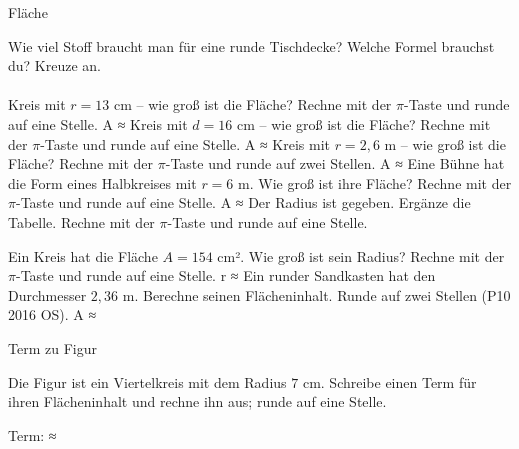 \setcounter{aufgabe}{14}

\begin{aufgabe}{Fläche}
\begin{teile}
\teil Wie viel Stoff braucht man für eine runde Tischdecke? Welche Formel brauchst du? Kreuze an.\\ \\ 
\teil Kreis mit $r = 13$ cm – wie groß ist die Fläche? Rechne mit der $\pi$-Taste und runde auf eine Stelle. A ≈ \leerfeld[cm²]
\teil Kreis mit $d = 16$ cm – wie groß ist die Fläche? Rechne mit der $\pi$-Taste und runde auf eine Stelle. A ≈ \leerfeld[cm²]
\teil Kreis mit $r = 2{,}6$ m – wie groß ist die Fläche? Rechne mit der $\pi$-Taste und runde auf zwei Stellen. A ≈ \leerfeld[m²]
\teil Eine Bühne hat die Form eines Halbkreises mit $r = 6$ m. Wie groß ist ihre Fläche? Rechne mit der $\pi$-Taste und runde auf eine Stelle. A ≈ \leerfeld[m²]
\teil Der Radius ist gegeben. Ergänze die Tabelle. Rechne mit der $\pi$-Taste und runde auf eine Stelle.

\teil Ein Kreis hat die Fläche $A = 154$ cm². Wie groß ist sein Radius? Rechne mit der $\pi$-Taste und runde auf eine Stelle. r ≈ \leerfeld[cm]
\teil Ein runder Sandkasten hat den Durchmesser $2{,}36$ m. Berechne seinen Flächeninhalt. Runde auf zwei Stellen \hfill (P10 2016 OS). A ≈ \leerfeld
\end{teile}
\end{aufgabe}

\begin{aufgabe}{Term zu Figur}
\begin{teile}
\teil Die Figur ist ein Viertelkreis mit dem Radius $7$ cm. Schreibe einen Term für ihren Flächeninhalt und rechne ihn aus; runde auf eine Stelle.

\begin{kreis}[2]    \end{kreis}
Term: \leerfeld ≈ \leerfeld[cm²]
\end{teile}
\end{aufgabe}

